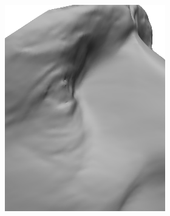 \begin{figure}
\begin{subfigure}{0.23\textwidth}
        \includegraphics[width=\textwidth]{statistical_normals/images/gsfs_results/celebrities/samuel_beckett_spherical_wrinkles.png}
    \end{subfigure}
    \\
    \begin{subfigure}{0.23\textwidth}
        \centering

\end{subfigure}
\end{figure}
